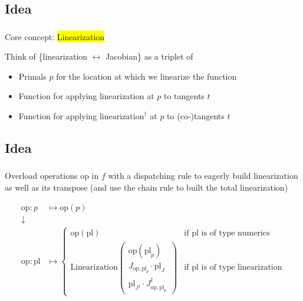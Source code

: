 \documentclass[aspectratio=169,xcolor=dvipsnames]{beamer}
\begin{document}
\subsection{Idea}
\begin{frame}
	\frametitle{\insertsection}
	\framesubtitle{\insertsubsection}

	Core concept: \colorbox{yellow}{Linearization}

	\pause
	\vspace{1em}
	Think of \{linearization $\leftrightarrow$ Jacobian\} as a triplet of
	\begin{itemize}
		\item Primals $p$ for the location at which we linearize the function
		\item Function for applying linearization at $p$ to tangents $t$
		\item Function for applying $\text{linearization}^\dagger$ at $p$ to (co-)tangents $t$
	\end{itemize}

\end{frame}

\subsection{Idea}
\begin{frame}
	\frametitle{\insertsection}
	\framesubtitle{\insertsubsection}

	Overload operations $\mathrm{op}$ in $f$ with a dispatching rule to eagerly build linearization as well as its transpose (and use the chain rule to built the total linearization)

	\pause
	\begin{align*}
		\mathrm{op}: p &\mapsto \mathrm{op}(p)
		\\
		\downarrow
		\\
		\mathrm{op}: \mathrm{pl} &\mapsto
		\begin{cases}
			\mathrm{op}(\mathrm{pl}) & \text{if $\mathrm{pl}$ is of type numerics}
			\\ \text{Linearization}
				\begin{pmatrix}
					\mathrm{op}(\mathrm{pl}_p)
					\\ J_{\mathrm{op},\mathrm{pl}_p} \cdot \mathrm{pl}_J
					\\ \mathrm{pl}_{J^\dagger} \cdot J_{\mathrm{op},\mathrm{pl}_p}^\dagger
				\end{pmatrix}
				& \text{if $\mathrm{pl}$ is of type linearization}
		\end{cases}
	\end{align*}
\end{frame}
\end{document}
